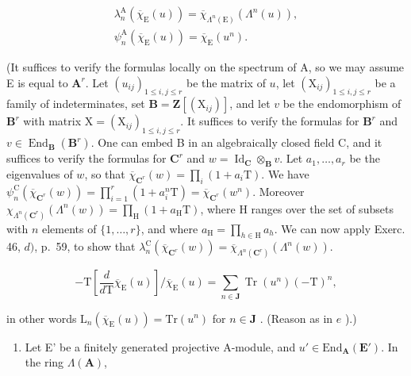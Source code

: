 \[
\begin{array}{l} \lambda_ {n} ^ {\mathrm{A}} (\overline {{\chi}} _ {\mathrm{E}} (u)) = \overline {{\chi}} _ {\Lambda^ {n} (\mathrm{E})} (\Lambda^ {n} (u)), \\ \psi_ {n} ^ {\mathrm{A}} (\overline {{\chi}} _ {\mathrm{E}} (u)) = \overline {{\chi}} _ {\mathrm{E}} (u ^ {n}). \end{array}
\]

(It suffices to verify the formulas locally on the spectrum of A, so we may assume E is equal to \(\mathbf{A}^r\). Let \((u_{ij})_{1\leqslant i,j\leqslant r}\) be the matrix of \(u\), let \((\mathrm{X}_{ij})_{1\leqslant i,j\leqslant r}\) be a family of indeterminates, set \(\mathbf{B} = \mathbf{Z}[(\mathrm{X}_{ij})]\), and let \(v\) be the endomorphism of \(\mathbf{B}^r\) with matrix \(\mathrm{X} = (\mathrm{X}_{ij})_{1\leqslant i,j\leqslant r}\). It suffices to verify the formulas for \(\mathbf{B}^r\) and \(v\in \operatorname {End}_{\mathbf{B}}(\mathbf{B}^r)\). One can embed B in an algebraically closed field C, and it suffices to verify the formulas for \(\mathbf{C}^r\) and \(w = \operatorname {Id}_{\mathbf{C}}\otimes_{\mathbf{B}}v\). Let \(a_1,\dots,a_r\) be the eigenvalues of \(w\), so that \(\overline{\chi}_{\mathbf{C}^r}(w) = \prod_i(1 + a_i\mathrm{T})\). We have \(\psi_n^{\mathrm{C}}(\overline{\chi}_{\mathbf{C}^r}(w)) = \prod_{i = 1}^{r}(1 + a_i^n\mathrm{T}) = \overline{\chi}_{\mathbf{C}^r}(w^n)\). Moreover \(\chi_{\Lambda^n (\mathbf{C}^r)}(\Lambda^n (w)) = \prod_{\mathrm{H}}(1 + a_{\mathrm{H}}\mathrm{T})\), where H ranges over the set of subsets with \(n\) elements of \(\{1,\dots,r\}\), and where \(a_{\mathrm{H}} = \prod_{h\in \mathrm{H}}a_h\). We can now apply Exerc. 46, \(d)\), p.~59, to show that \(\lambda_n^{\mathrm{C}}(\overline{\chi}_{\mathbf{C}^r}(w)) = \overline{\chi}_{\Lambda^{n}(\mathbf{C}^{r})}(\Lambda^{n}(w)).\)

\[
- \mathrm{T} \left[ \frac {d}{d \mathrm{T}} \overline {{{\chi}}} _ {\mathrm{E}} (u) \right] / \overline {{{\chi}}} _ {\mathrm{E}} (u) = \sum_ {n \in \mathbf {J}} \operatorname{Tr} (u ^ {n}) (- \mathrm{T}) ^ {n},
\]

in other words \(\mathrm{L}_n(\overline{\chi}_{\mathrm{E}}(u)) = \mathrm{Tr}(u^n)\) for \(n \in \mathbf{J}\) . (Reason as in \(e\) ).)

\begin{enumerate}
\def\labelenumi{\alph{enumi})}
\setcounter{enumi}{6}
\tightlist
\item
  Let E' be a finitely generated projective A-module, and \(u' \in \mathrm{End}_{\mathbf{A}}(\mathbf{E}')\). In the ring \(\Lambda(\mathbf{A})\),
\end{enumerate}

